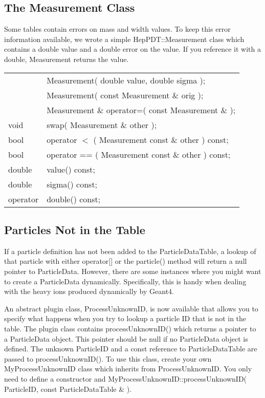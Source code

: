 \subsection{ The Measurement Class }

Some tables contain errors on mass and width values.
To keep this error information available, we wrote a simple HepPDT::Measurement
class which contains a double value and a double error on the value.
If you reference it with a double, Measurement returns the value.

\begin{center}
\begin{tabular}{ll}
 & Measurement( double value, double sigma ); \\
 & Measurement( const Measurement \& orig );  \\
 & Measurement \& operator=( const Measurement \& );  \\
void & swap( Measurement \& other );  \\
bool  & operator $<$  ( Measurement const \& other ) const;  \\
bool   & operator == ( Measurement const \& other ) const;  \\
   double  &  value()  const;\\
   double   & sigma()  const;\\
   operator & double() const;\\
\end{tabular}
\end{center}

\subsection{ Particles Not in the Table }

If a particle definition has not been added to the ParticleDataTable,
a lookup of that particle with either operator[] or the particle() method
will return a null pointer to ParticleData.   However, there are some instances
where you might want to create a ParticleData dynamically.  Specifically,
this is handy when dealing with the heavy ions produced dynamically by
Geant4.

An abstract plugin class, ProcessUnknownID, is now available that allows you
to specify what happens when you try to lookup a particle ID that is not
in the table.  The plugin class contains processUnknownID() which returns
a pointer to a ParticleData object.  
This pointer should be null if no ParticleData object is defined.
The unknown ParticleID and a const reference to ParticleDataTable are 
passed to processUnknownID().
To use this class, create your own MyProcessUnknownID class
which inherits from ProcessUnknownID.  
You only need to define a constructor and 
MyProcessUnknownID::processUnknownID( ParticleID,  const ParticleDataTable \& ).

